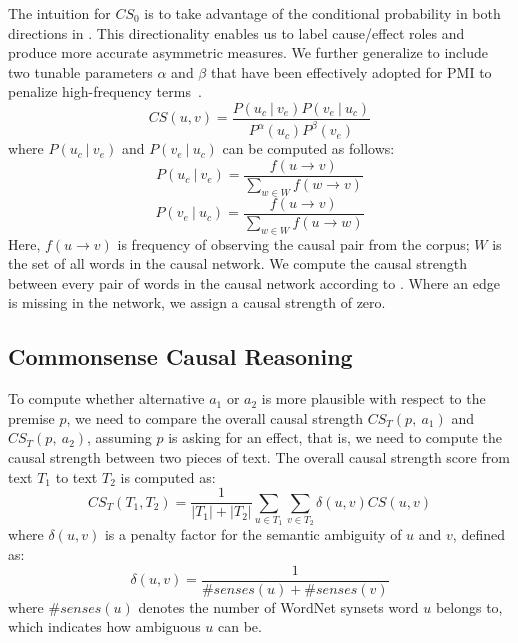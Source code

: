 The intuition for $CS_0$ is to take advantage of the conditional
probability in both directions in . This
directionality enables us to label cause/effect roles and produce more
accurate asymmetric measures. We further generalize
 to include two tunable parameters $\alpha$ and
$\beta$ that have been effectively adopted for PMI to penalize
high-frequency terms~\cite{Church:assoc}.
\begin{equation}
CS(u,v) = \frac{P(u_c~|~v_e) P(v_e~|~u_c)}
{P^\alpha(u_c)P^\beta(v_e)}\label{eq:cpmi}
\end{equation}
where
$P(u_c~|~v_e)$ and $P(v_e~|~u_c)$ can be computed as follows:
\begin{equation}
P(u_c~|~v_e) = \frac{f(u \rightarrow v)}{\sum_{w\in W}
f (w\rightarrow v)}
\end{equation}
\begin{equation}
P(v_e~|~u_c) = \frac{f(u\rightarrow v)}{\sum_{w\in W}
f(u\rightarrow w)}
\end{equation}
Here, $f(u\rightarrow v)$ is frequency of observing the causal pair
from the corpus; $W$ is the set of all words in the causal network.
We compute the causal strength between every pair of words in the causal network
according to . Where an edge is missing in the network,
we assign a causal strength of zero.

\subsection{Commonsense Causal Reasoning}
\label{sec:reasoning}

To compute whether alternative $a_1$ or $a_2$ is more plausible
with respect to the premise $p$, we need to compare the overall causal
strength $CS_T(p,~a_1)$ and $CS_T(p,~a_2)$, assuming $p$ is asking
for an effect, that is, we need to compute the causal strength between two
pieces of text. The overall causal strength score from text $T_1$ to
text $T_2$ is computed as:
\begin{equation}
CS_T(T_1,T_2)=\frac{1}{|T_1|+|T_2|}\sum_{u \in T_1}\sum_{v \in T_2}
\delta(u, v) CS(u, v)
\label{eq:csall}
\end{equation}
where $\delta(u,v)$ is a penalty factor for the semantic ambiguity of
$u$ and $v$, defined as:
\begin{equation}
\delta(u,v) = \frac{1}{\#senses(u)+\#senses(v)}
\end{equation}
where $\#senses(u)$ denotes the number of WordNet synsets word $u$
belongs to, which indicates how ambiguous $u$ can be.

